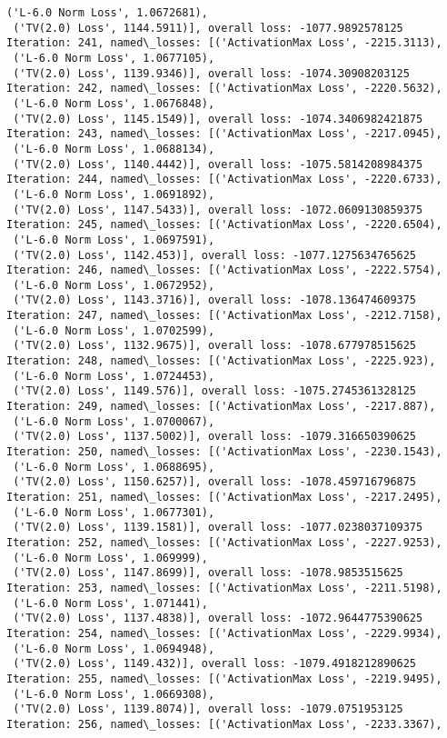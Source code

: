 \documentclass[10pt]{article}
\begin{document}
\begin{Verbatim}[commandchars=\\\{\}]
 ('L-6.0 Norm Loss', 1.0672681),
 ('TV(2.0) Loss', 1144.5911)], overall loss: -1077.9892578125
Iteration: 241, named\_losses: [('ActivationMax Loss', -2215.3113),
 ('L-6.0 Norm Loss', 1.0677105),
 ('TV(2.0) Loss', 1139.9346)], overall loss: -1074.30908203125
Iteration: 242, named\_losses: [('ActivationMax Loss', -2220.5632),
 ('L-6.0 Norm Loss', 1.0676848),
 ('TV(2.0) Loss', 1145.1549)], overall loss: -1074.3406982421875
Iteration: 243, named\_losses: [('ActivationMax Loss', -2217.0945),
 ('L-6.0 Norm Loss', 1.0688134),
 ('TV(2.0) Loss', 1140.4442)], overall loss: -1075.5814208984375
Iteration: 244, named\_losses: [('ActivationMax Loss', -2220.6733),
 ('L-6.0 Norm Loss', 1.0691892),
 ('TV(2.0) Loss', 1147.5433)], overall loss: -1072.0609130859375
Iteration: 245, named\_losses: [('ActivationMax Loss', -2220.6504),
 ('L-6.0 Norm Loss', 1.0697591),
 ('TV(2.0) Loss', 1142.453)], overall loss: -1077.1275634765625
Iteration: 246, named\_losses: [('ActivationMax Loss', -2222.5754),
 ('L-6.0 Norm Loss', 1.0672952),
 ('TV(2.0) Loss', 1143.3716)], overall loss: -1078.136474609375
Iteration: 247, named\_losses: [('ActivationMax Loss', -2212.7158),
 ('L-6.0 Norm Loss', 1.0702599),
 ('TV(2.0) Loss', 1132.9675)], overall loss: -1078.677978515625
Iteration: 248, named\_losses: [('ActivationMax Loss', -2225.923),
 ('L-6.0 Norm Loss', 1.0724453),
 ('TV(2.0) Loss', 1149.576)], overall loss: -1075.2745361328125
Iteration: 249, named\_losses: [('ActivationMax Loss', -2217.887),
 ('L-6.0 Norm Loss', 1.0700067),
 ('TV(2.0) Loss', 1137.5002)], overall loss: -1079.316650390625
Iteration: 250, named\_losses: [('ActivationMax Loss', -2230.1543),
 ('L-6.0 Norm Loss', 1.0688695),
 ('TV(2.0) Loss', 1150.6257)], overall loss: -1078.459716796875
Iteration: 251, named\_losses: [('ActivationMax Loss', -2217.2495),
 ('L-6.0 Norm Loss', 1.0677301),
 ('TV(2.0) Loss', 1139.1581)], overall loss: -1077.0238037109375
Iteration: 252, named\_losses: [('ActivationMax Loss', -2227.9253),
 ('L-6.0 Norm Loss', 1.069999),
 ('TV(2.0) Loss', 1147.8699)], overall loss: -1078.9853515625
Iteration: 253, named\_losses: [('ActivationMax Loss', -2211.5198),
 ('L-6.0 Norm Loss', 1.071441),
 ('TV(2.0) Loss', 1137.4838)], overall loss: -1072.9644775390625
Iteration: 254, named\_losses: [('ActivationMax Loss', -2229.9934),
 ('L-6.0 Norm Loss', 1.0694948),
 ('TV(2.0) Loss', 1149.432)], overall loss: -1079.4918212890625
Iteration: 255, named\_losses: [('ActivationMax Loss', -2219.9495),
 ('L-6.0 Norm Loss', 1.0669308),
 ('TV(2.0) Loss', 1139.8074)], overall loss: -1079.0751953125
Iteration: 256, named\_losses: [('ActivationMax Loss', -2233.3367),

\end{Verbatim}
\end{document}
